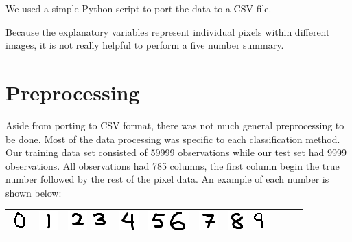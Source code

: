 \documentclass[10pt]{extarticle}
\begin{document}
We used a simple Python script to port the data to a CSV file. 

Because the explanatory variables represent individual pixels within different images, it is not really helpful to perform a five number summary. 

\section{Preprocessing}

Aside from porting to CSV format, there was not much general preprocessing to be done. Most of the data processing was specific to each classification method. Our training data set consisted of 59999 observations while our test set had 9999 observations. All observations had 785 columns, the first column begin the true number followed by the rest of the pixel data. An example of each number is shown below:

\begin{center}
	\begin{tabular}{c c c c c c c c c c}
		\includegraphics{zero.png} & \includegraphics{one.png} & \includegraphics{two.png} 
		\includegraphics{three.png} & \includegraphics{four.png} & \includegraphics{five.png} 
		\includegraphics{six.png} &\includegraphics{seven.png} &\includegraphics{eight.png} 
		\includegraphics{nine.png}
	\end{tabular} 
\end{center}
\end{document}
